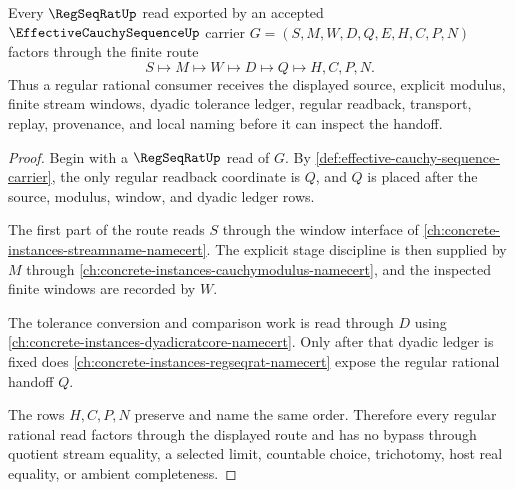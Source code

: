 \begin{theorem}\label{thm:effective-cauchy-sequence-regseqrat-handoff}
Every $\RegSeqRatUp$ read exported by an accepted $\EffectiveCauchySequenceUp$ carrier $G=(S,M,W,D,Q,E,H,C,P,N)$ factors through the finite route
$$
S \longmapsto M \longmapsto W \longmapsto D \longmapsto Q \longmapsto H,C,P,N .
$$
Thus a regular rational consumer receives the displayed source, explicit modulus, finite stream windows, dyadic tolerance ledger, regular readback, transport, replay, provenance, and local naming before it can inspect the handoff.
\end{theorem}
\begin{proof}
Begin with a $\RegSeqRatUp$ read of $G$. By \autoref{def:effective-cauchy-sequence-carrier}, the only regular readback coordinate is $Q$, and $Q$ is placed after the source, modulus, window, and dyadic ledger rows.

The first part of the route reads $S$ through the window interface of \autoref{ch:concrete-instances-streamname-namecert}. The explicit stage discipline is then supplied by $M$ through \autoref{ch:concrete-instances-cauchymodulus-namecert}, and the inspected finite windows are recorded by $W$.

The tolerance conversion and comparison work is read through $D$ using \autoref{ch:concrete-instances-dyadicratcore-namecert}. Only after that dyadic ledger is fixed does \autoref{ch:concrete-instances-regseqrat-namecert} expose the regular rational handoff $Q$.

The rows $H,C,P,N$ preserve and name the same order. Therefore every regular rational read factors through the displayed route and has no bypass through quotient stream equality, a selected limit, countable choice, trichotomy, host real equality, or ambient completeness.
\end{proof}


